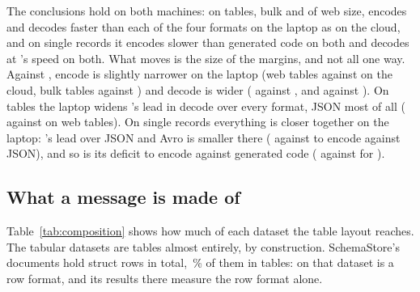 The conclusions hold on both machines: on tables, bulk and of web size,
\colbin{} encodes and decodes faster than each of the four formats on the
laptop as on the cloud, and on single records it encodes slower than
generated code on both and decodes at 's speed on both. What
moves is the size of the margins, and not all one way. Against
, encode is slightly narrower on the laptop (web tables
 against
 on the cloud, bulk tables
 against
) and decode is wider
(
against , and
 against
). On tables the laptop widens
\colbin{}'s lead in decode over every format, JSON most of all
(
against  on web tables). On
single records everything is closer together on the laptop: \colbin{}'s
lead over JSON and Avro is smaller there
( against
 to encode against JSON), and
so is its deficit to encode against generated code
(
against  for
).

\FloatBarrier
\subsection{What a message is made of}
\label{sec:composition}

\begin{table}[t]
\centering\footnotesize
{}
\caption{\colbin{} messages by regime and dataset: struct rows at any depth,
the share of them written as table rows, the share of the message's bytes
that are tables, and the schema section (median bytes per case; median
share of the message it describes; the section is not part of the message
unless embedded). The last column is the median of bytes per leaf value.}
\label{tab:composition}
\end{table}

Table~\ref{tab:composition} shows how much of each dataset the table layout
reaches. The tabular datasets are tables almost entirely, by construction.
SchemaStore's documents hold 
struct rows in total, \,\% of
them in tables: on that dataset \colbin{} is a row format, and its results
there measure the row format alone.

